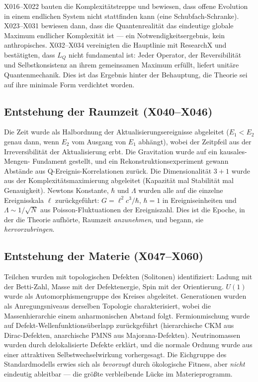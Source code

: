 \documentclass[10pt,twoside,openany]{book}
\begin{document}
X016--X022 bauten die Komplexitätstreppe und bewiesen, dass offene Evolution in einem
endlichen System nicht stattfinden kann (eine Schubfach-Schranke). X023--X031 bewiesen
dann, dass die Quantenrealität das eindeutige globale Maximum endlicher Komplexität ist ---
ein Notwendigkeitsergebnis, kein anthropisches. X032--X034 vereinigten die Hauptlinie mit
ResearchX und bestätigten, dass $L_Q$ nicht fundamental ist: Jeder Operator, der
Reversibilität und Selbstkonsistenz an ihrem gemeinsamen Maximum erfüllt, liefert unitäre
Quantenmechanik. Dies ist das Ergebnis hinter der Behauptung, die Theorie sei auf ihre
minimale Form verdichtet worden.

\subsection{Entstehung der Raumzeit (X040--X046)}

Die Zeit wurde als Halbordnung der Aktualisierungsereignisse abgeleitet ($E_1<E_2$ genau
dann, wenn $E_2$ vom Ausgang von $E_1$ abhängt), wobei der Zeitpfeil aus der
Irreversibilität der Aktualisierung erbt. Die Gravitation wurde auf ein kausales-Mengen-
Fundament gestellt, und ein Rekonstruktionsexperiment gewann Abstände aus
Q-Ereignis-Korrelationen zurück. Die Dimensionalität $3{+}1$ wurde aus der
Komplexitätsmaximierung abgeleitet (Kapazität mal Stabilität mal Genauigkeit). Newtons
Konstante, $\hbar$ und $\Lambda$ wurden alle auf die einzelne Ereignisskala $\ell$
zurückgeführt: $G=\ell^2c^3/\hbar$, $\hbar=1$ in Ereigniseinheiten und $\Lambda\sim1/\sqrt N$
aus Poisson-Fluktuationen der Ereigniszahl. Dies ist die Epoche, in der die Theorie
aufhörte, Raumzeit \emph{anzunehmen}, und begann, sie \emph{hervorzubringen}.

\subsection{Entstehung der Materie (X047--X060)}

Teilchen wurden mit topologischen Defekten (Solitonen) identifiziert: Ladung mit der
Betti-Zahl, Masse mit der Defektenergie, Spin mit der Orientierung. $U(1)$ wurde als
Automorphismengruppe des Kreises abgeleitet. Generationen wurden als Anregungsniveaus
derselben Topologie charakterisiert, wobei die Massenhierarchie einem anharmonischen
Abstand folgt. Fermionmischung wurde auf Defekt-Wellenfunktionsüberlapp zurückgeführt
(hierarchische CKM aus Dirac-Defekten, anarchische PMNS aus Majorana-Defekten).
Neutrinomassen wurden durch delokalisierte Defekte erklärt, und die normale Ordnung wurde
aus einer attraktiven Selbstwechselwirkung vorhergesagt. Die Eichgruppe des Standardmodells
erwies sich als \emph{bevorzugt} durch ökologische Fitness, aber \emph{nicht} eindeutig
ableitbar --- die größte verbleibende Lücke im Materieprogramm.
\end{document}
